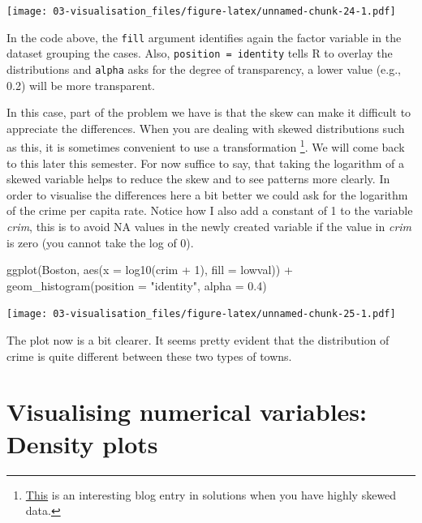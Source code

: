 \documentclass[
]{book}
\newenvironment{Shaded}{\begin{snugshade}}{\end{snugshade}}
\newcommand{\AttributeTok}[1]{\textcolor[rgb]{0.77,0.63,0.00}{#1}}
\newcommand{\DecValTok}[1]{\textcolor[rgb]{0.00,0.00,0.81}{#1}}
\newcommand{\FloatTok}[1]{\textcolor[rgb]{0.00,0.00,0.81}{#1}}
\newcommand{\FunctionTok}[1]{\textcolor[rgb]{0.00,0.00,0.00}{#1}}
\newcommand{\NormalTok}[1]{#1}
\newcommand{\SpecialCharTok}[1]{\textcolor[rgb]{0.00,0.00,0.00}{#1}}
\newcommand{\StringTok}[1]{\textcolor[rgb]{0.31,0.60,0.02}{#1}}
\begin{document}
\texttt{[image: 03-visualisation\_files/figure-latex/unnamed-chunk-24-1.pdf]}

In the code above, the \texttt{fill} argument identifies again the factor variable in the dataset grouping the cases. Also, \texttt{position\ =\ identity} tells R to overlay the distributions and \texttt{alpha} asks for the degree of transparency, a lower value (e.g., 0.2) will be more transparent.

In this case, part of the problem we have is that the skew can make it difficult to appreciate the differences. When you are dealing with skewed distributions such as this, it is sometimes convenient to use a transformation \footnote{\href{http://tomhopper.me/2010/08/30/graphing-highly-skewed-data/}{This} is an interesting blog entry in solutions when you have highly skewed data.}. We will come back to this later this semester. For now suffice to say, that taking the logarithm of a skewed variable helps to reduce the skew and to see patterns more clearly. In order to visualise the differences here a bit better we could ask for the logarithm of the crime per capita rate. Notice how I also add a constant of 1 to the variable \emph{crim}, this is to avoid NA values in the newly created variable if the value in \emph{crim} is zero (you cannot take the log of 0).

\begin{Shaded}
\begin{Highlighting}[]
\FunctionTok{ggplot}\NormalTok{(Boston, }\FunctionTok{aes}\NormalTok{(}\AttributeTok{x =} \FunctionTok{log10}\NormalTok{(crim }\SpecialCharTok{+} \DecValTok{1}\NormalTok{), }\AttributeTok{fill =}\NormalTok{ lowval)) }\SpecialCharTok{+}
  \FunctionTok{geom\_histogram}\NormalTok{(}\AttributeTok{position =} \StringTok{"identity"}\NormalTok{, }\AttributeTok{alpha =} \FloatTok{0.4}\NormalTok{)}
\end{Highlighting}
\end{Shaded}

\texttt{[image: 03-visualisation\_files/figure-latex/unnamed-chunk-25-1.pdf]}

The plot now is a bit clearer. It seems pretty evident that the distribution of crime is quite different between these two types of towns.

\hypertarget{visualising-numerical-variables-density-plots}{%
\section{Visualising numerical variables: Density plots}\label{visualising-numerical-variables-density-plots}}
\end{document}
